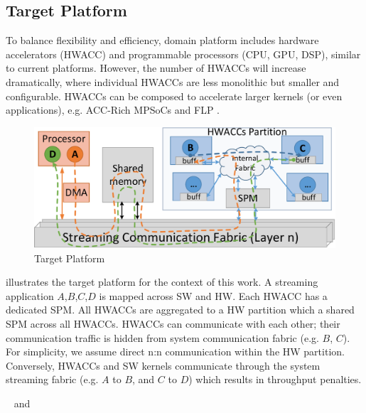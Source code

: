 \subsection{Target Platform}
\label{sec:Platform}

To balance flexibility and efficiency, domain platform includes hardware accelerators (HWACC) and programmable processors (CPU, GPU, DSP), similar to current platforms. However, the number of HWACCs will increase dramatically, where individual HWACCs are less monolithic but smaller and configurable. HWACCs can be composed to accelerate larger kernels (or even applications), e.g. ACC-Rich MPSoCs \cite{cong2014accelerator} and FLP \cite{tabkhi2014function}. 

\begin{figure}[h]
	\centering
	\includegraphics[width=.65\linewidth]{fig/pPlat.pdf}
	\caption{Target Platform}
	\label{fig:plat}
	\vspace{-4pt}
\end{figure}

 illustrates the target platform for the context of this work. A streaming application $A$,$B$,$C$,$D$ is mapped across SW and HW. Each HWACC has a dedicated SPM. All HWACCs are aggregated to a HW partition which a shared SPM across all HWACCs. HWACCs can communicate with each other; their communication traffic is hidden from system communication fabric (e.g. $B$, $C$). For simplicity, we assume direct n:n communication within the HW partition. Conversely, HWACCs and SW kernels communicate through the system streaming fabric (e.g. $A$ to $B$, and $C$ to $D$) which results in throughput penalties.



~ and ~ 